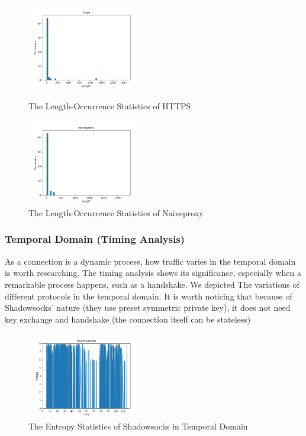 \documentclass[conference]{IEEEtran}
\begin{document}
\begin{figure}
    \centering
    \includegraphics[width=0.45\textwidth]{pics/occurrence_of_length_https.png}
    \caption{The Length-Occurrence Statistics of HTTPS}
    \centering
    \includegraphics[width=0.45\textwidth]{pics/occurrence_of_length_naiveproxy.png}
    \caption{The Length-Occurrence Statistics of Naiveproxy}
\end{figure}

\subsubsection{Temporal Domain (Timing Analysis)}
As a connection is a dynamic process, how traffic varies in the temporal domain is worth researching. The timing analysis  shows its significance, especially when a remarkable process happens, such as a handshake.
We depicted The variations of different protocols in the temporal domain. It is worth noticing that because of Shadowsocks' nature (they use preset symmetric private key), it does not need key exchange and handshake (the connection itself can be stateless)

\begin{figure}[H]
    \centering
    \includegraphics[width=0.45\textwidth]{pics/temporal_statistic_of_entropy_shadowsocks.png}
    \caption{The Entropy Statistics of Shadowsocks in Temporal Domain}
\end{figure}
\end{document}
